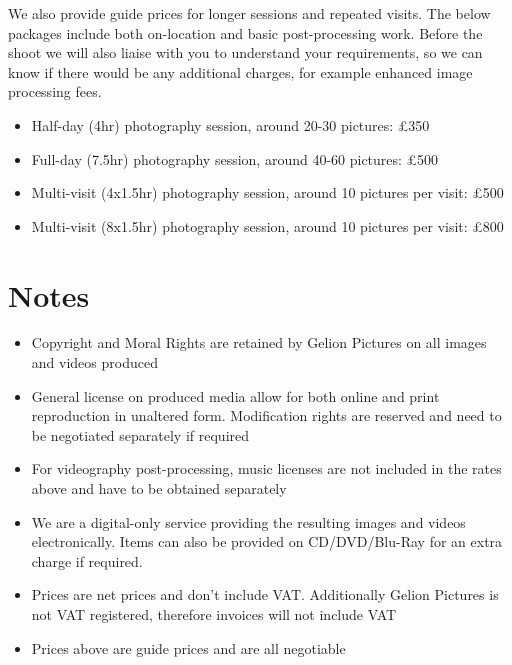 \documentclass[10pt,a4paper,roman]{moderncv}
\begin{document}
We also provide guide prices for longer sessions and repeated visits. The below packages include both on-location and basic post-processing work. Before the shoot we will also liaise with you to understand your requirements, so we can know if there would be any additional charges, for example enhanced image processing fees.

\vspace{1em}

\begin{itemize}
\item Half-day (4hr) photography session, around 20-30 pictures: £350
\item Full-day (7.5hr) photography session, around 40-60 pictures: £500
\item Multi-visit (4x1.5hr) photography session, around 10 pictures per visit: £500
\item Multi-visit (8x1.5hr) photography session, around 10 pictures per visit: £800
\end{itemize}

\vspace{2em}

\section{Notes}

\begin{itemize}
\item Copyright and Moral Rights are retained by Gelion Pictures on all images and videos produced
\item General license on produced media allow for both online and print reproduction in unaltered form. Modification rights are reserved and need to be negotiated separately if required
\item For videography post-processing, music licenses are not included in the rates above and have to be obtained separately
\item We are a digital-only service providing the resulting images and videos electronically. Items can also be provided on CD/DVD/Blu-Ray for an extra charge if required.
\item Prices are net prices and don't include VAT. Additionally Gelion Pictures is not VAT registered, therefore invoices will not include VAT
\item Prices above are guide prices and are all negotiable
\end{itemize}
\end{document}
